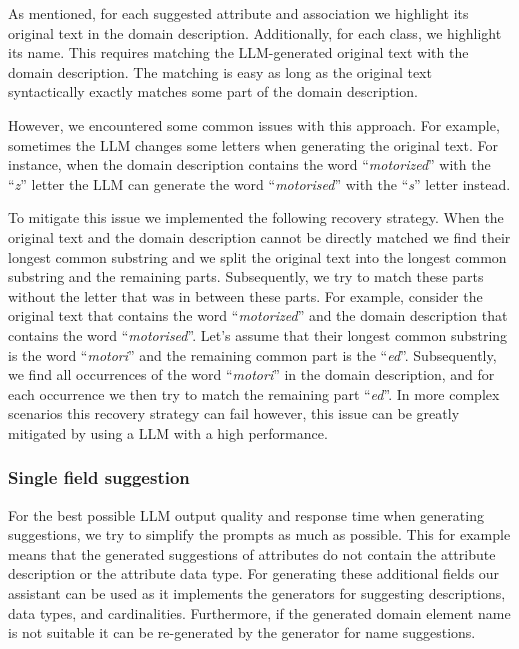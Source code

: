 As mentioned, for each suggested attribute and association we highlight its original text in the domain description. Additionally, for each class, we highlight its name. This requires matching the LLM-generated original text with the domain description. The matching is easy as long as the original text syntactically exactly matches some part of the domain description.

However, we encountered some common issues with this approach. For example, sometimes the LLM changes some letters when generating the original text. For instance, when the domain description contains the word ``\textit{motorized}'' with the ``\textit{z}'' letter the LLM can generate the word ``\textit{motorised}'' with the ``\textit{s}'' letter instead.

To mitigate this issue we implemented the following recovery strategy. When the original text and the domain description cannot be directly matched we find their longest common substring and we split the original text into the longest common substring and the remaining parts. Subsequently, we try to match these parts without the letter that was in between these parts. For example, consider the original text that contains the word ``\textit{motorized}'' and the domain description that contains the word ``\textit{motorised}''. Let's assume that their longest common substring is the word ``\textit{motori}'' and the remaining common part is the ``{\textit{ed}}''. Subsequently, we find all occurrences of the word ``\textit{motori}'' in the domain description, and for each occurrence we then try to match the remaining part ``\textit{ed}''. In more complex scenarios this recovery strategy can fail however, this issue can be greatly mitigated by using a LLM with a high performance.


\subsubsection{Single field suggestion}

For the best possible LLM output quality and response time when generating suggestions, we try to simplify the prompts as much as possible. This for example means that the generated suggestions of attributes do not contain the attribute description or the attribute data type. For generating these additional fields our assistant can be used as it implements the generators for suggesting descriptions, data types, and cardinalities. Furthermore, if the generated domain element name is not suitable it can be re-generated by the generator for name suggestions.


